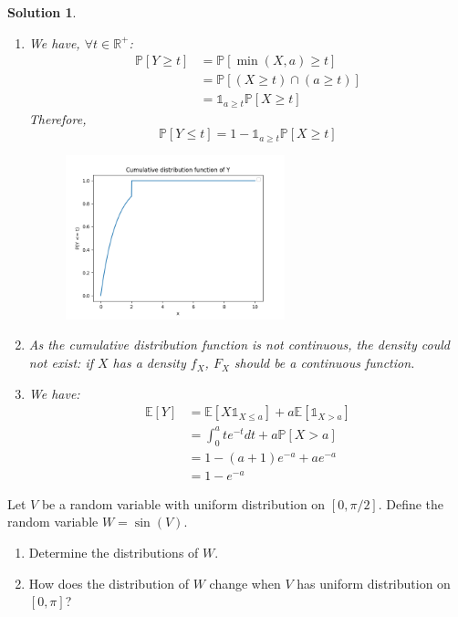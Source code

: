 \documentclass{article}
\newcommand{\proba}[1]{\mathbb{P}[#1]}
\newcommand{\esperance}[1]{\mathbb{E}[#1]}
\newcommand{\indicator}[1]{\mathbb{1}_{#1}}
\newcommand{\R}{\mathbb{R}}
\newtheorem{solution}{Solution}
\begin{document}
\begin{solution}
  \begin{enumerate}
    \item We have, $\forall t \in \R^+$:
          \begin{align*}
            \proba{Y \geq t} & = \proba{\min(X, a) \geq t}             \\
                             & = \proba{(X \geq t) \cap (a \geq t)}    \\
                             & = \indicator{a \geq t} \proba{X \geq t}
          \end{align*}
          Therefore,
          \[
            \proba{Y \leq t} = 1 - \indicator{a \geq t} \proba{X \geq t}
          \]
          \begin{figure}[h]
            \centering
            \includegraphics[width=0.6\textwidth]{cdf.png}
          \end{figure}
    \item As the cumulative distribution function is not continuous, the density could not exist: if $X$ has a density $f_X$, $F_X$ should be a continuous function.
    \item We have:
          \begin{align*}
            \esperance{Y} & = \esperance{X \mathbb{1}_{X \leq a} } + a \esperance{\mathbb{1}_{X>a}} \\
                          & = \int_0^a t e^{-t} dt + a \proba{X > a}                                \\
                          & = 1 - (a+1) e^{-a} + a e^{-a}                                           \\
                          & = 1 - e^{-a}
          \end{align*}
  \end{enumerate}
\end{solution}

\begin{Exercise} Let $V$ be a random variable with uniform distribution on $[0, \pi / 2]$. Define the random variable $W=\sin (V)$.
  \begin{enumerate}
    \item Determine the distributions of $W$.
    \item How does the distribution of $W$ change when $V$ has uniform distribution on
          $[0, \pi]$?
  \end{enumerate}
\end{Exercise}
\end{document}
